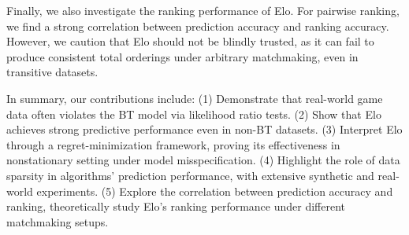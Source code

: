 

Finally, we also investigate the ranking performance of Elo. For pairwise ranking, we find a strong correlation between prediction accuracy and ranking accuracy. However, we caution that Elo should not be blindly trusted, as it can fail to produce consistent total orderings under arbitrary matchmaking, even in transitive datasets.

In summary, our contributions include:
(1) Demonstrate that real-world game data often violates the BT model via likelihood ratio tests.
(2) Show that Elo achieves strong predictive performance even in non-BT datasets.
(3) Interpret Elo through a regret-minimization framework, proving its effectiveness in nonstationary setting under model misspecification.
(4) Highlight the role of data sparsity in algorithms' prediction performance, with extensive synthetic and real-world experiments. (5) Explore the correlation between prediction accuracy and ranking, theoretically study Elo's ranking performance under different matchmaking setups.





